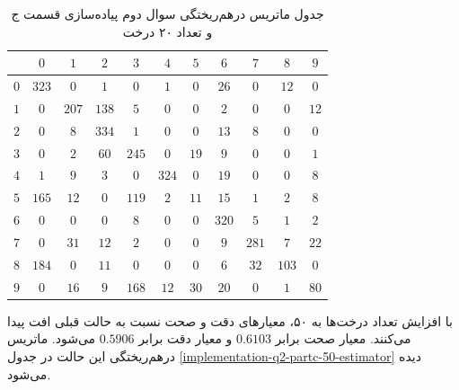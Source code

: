 \documentclass{article}
\begin{document}
\begin{table}[h]
    \centering
    \caption{جدول ماتریس درهم‌ریختگی سوال دوم پیاده‌سازی قسمت ج و تعداد ۲۰ درخت}
    \label{implementation-q2-partc-20-estimator}
    \begin{tabular}{c||c|c|c|c|c|c|c|c|c|c}
        & $0$ & $1$ & $2$ & $3$ & $4$ & $5$ & $6$ & $7$ & $8$ & $9$ \\
        \hline\hline
        $0$ & $323$ & $0$ & $1$ & $0$ & $1$ & $0$ & $26$ & $0$ & $12$ & $0$ \\
        \hline
        $1$ & $0$ & $207$ & $138$ & $5$ & $0$ & $0$ & $2$ & $0$ & $0$ & $12$ \\
        \hline
        $2$ & $0$ & $8$ & $334$ & $1$ & $0$ & $0$ & $13$ & $8$ & $0$ & $0$ \\
        \hline
        $3$ & $0$ & $2$ & $60$ & $245$ & $0$ & $19$ & $9$ & $0$ & $0$ & $1$ \\
        \hline
        $4$ & $1$ & $9$ & $3$ & $0$ & $324$ & $0$ & $19$ & $0$ & $0$ & $8$ \\
        \hline
        $5$ & $165$ & $12$ & $0$ & $119$ & $2$ & $11$ & $15$ & $1$ & $2$ & $8$ \\
        \hline
        $6$ & $0$ & $0$ & $0$ & $8$ & $0$ & $0$ & $320$ & $5$ & $1$ & $2$ \\
        \hline
        $7$ & $0$ & $31$ & $12$ & $2$ & $0$ & $0$ & $9$ & $281$ & $7$ & $22$ \\
        \hline
        $8$ & $184$ & $0$ & $11$ & $0$ & $0$ & $0$ & $6$ & $32$ & $103$ & $0$ \\
        \hline
        $9$ & $0$ & $16$ & $9$ & $168$ & $12$ & $30$ & $20$ & $0$ & $1$ & $80$
    \end{tabular}
\end{table}

با افزایش تعداد درخت‌ها به ۵۰، معیارهای دقت و صحت نسبت به حالت قبلی افت پیدا می‌کنند. معیار صحت برابر $0.6103$ و
معیار دقت برابر $0.5906$ می‌شود. ماتریس درهم‌ریختگی این حالت در جدول \ref{implementation-q2-partc-50-estimator}
دیده می‌شود.
\end{document}
